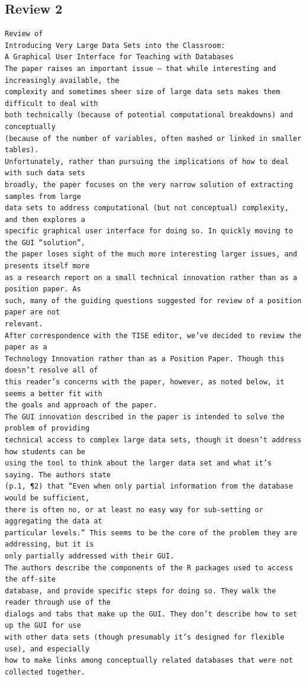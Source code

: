 \documentclass[11pt]{tise_style}
\begin{document}
\subsection{{Review 2}}
\begin{verbatim}
Review of
Introducing Very Large Data Sets into the Classroom:
A Graphical User Interface for Teaching with Databases
The paper raises an important issue – that while interesting and increasingly available, the
complexity and sometimes sheer size of large data sets makes them difficult to deal with
both technically (because of potential computational breakdowns) and conceptually
(because of the number of variables, often mashed or linked in smaller tables).
Unfortunately, rather than pursuing the implications of how to deal with such data sets
broadly, the paper focuses on the very narrow solution of extracting samples from large
data sets to address computational (but not conceptual) complexity, and then explores a
specific graphical user interface for doing so. In quickly moving to the GUI “solution”,
the paper loses sight of the much more interesting larger issues, and presents itself more
as a research report on a small technical innovation rather than as a position paper. As
such, many of the guiding questions suggested for review of a position paper are not
relevant.
After correspondence with the TISE editor, we’ve decided to review the paper as a
Technology Innovation rather than as a Position Paper. Though this doesn’t resolve all of
this reader’s concerns with the paper, however, as noted below, it seems a better fit with
the goals and approach of the paper.
The GUI innovation described in the paper is intended to solve the problem of providing
technical access to complex large data sets, though it doesn’t address how students can be
using the tool to think about the larger data set and what it’s saying. The authors state
(p.1, ¶2) that “Even when only partial information from the database would be sufficient,
there is often no, or at least no easy way for sub-setting or aggregating the data at
particular levels.” This seems to be the core of the problem they are addressing, but it is
only partially addressed with their GUI.
The authors describe the components of the R packages used to access the off-site
database, and provide specific steps for doing so. They walk the reader through use of the
dialogs and tabs that make up the GUI. They don’t describe how to set up the GUI for use
with other data sets (though presumably it’s designed for flexible use), and especially
how to make links among conceptually related databases that were not collected together.

\end{verbatim}
\end{document}
